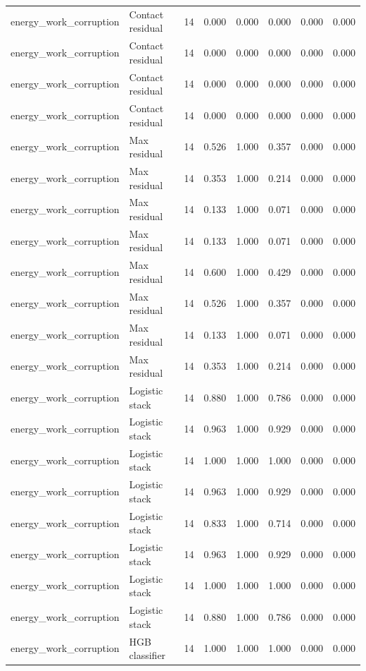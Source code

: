 {\begin{longtable}{llrrrrrr}
energy\_work\_corruption & Contact residual & 14 & 0.000 & 0.000 & 0.000 & 0.000 & 0.000 \\
energy\_work\_corruption & Contact residual & 14 & 0.000 & 0.000 & 0.000 & 0.000 & 0.000 \\
energy\_work\_corruption & Contact residual & 14 & 0.000 & 0.000 & 0.000 & 0.000 & 0.000 \\
energy\_work\_corruption & Contact residual & 14 & 0.000 & 0.000 & 0.000 & 0.000 & 0.000 \\
energy\_work\_corruption & Max residual & 14 & 0.526 & 1.000 & 0.357 & 0.000 & 0.000 \\
energy\_work\_corruption & Max residual & 14 & 0.353 & 1.000 & 0.214 & 0.000 & 0.000 \\
energy\_work\_corruption & Max residual & 14 & 0.133 & 1.000 & 0.071 & 0.000 & 0.000 \\
energy\_work\_corruption & Max residual & 14 & 0.133 & 1.000 & 0.071 & 0.000 & 0.000 \\
energy\_work\_corruption & Max residual & 14 & 0.600 & 1.000 & 0.429 & 0.000 & 0.000 \\
energy\_work\_corruption & Max residual & 14 & 0.526 & 1.000 & 0.357 & 0.000 & 0.000 \\
energy\_work\_corruption & Max residual & 14 & 0.133 & 1.000 & 0.071 & 0.000 & 0.000 \\
energy\_work\_corruption & Max residual & 14 & 0.353 & 1.000 & 0.214 & 0.000 & 0.000 \\
energy\_work\_corruption & Logistic stack & 14 & 0.880 & 1.000 & 0.786 & 0.000 & 0.000 \\
energy\_work\_corruption & Logistic stack & 14 & 0.963 & 1.000 & 0.929 & 0.000 & 0.000 \\
energy\_work\_corruption & Logistic stack & 14 & 1.000 & 1.000 & 1.000 & 0.000 & 0.000 \\
energy\_work\_corruption & Logistic stack & 14 & 0.963 & 1.000 & 0.929 & 0.000 & 0.000 \\
energy\_work\_corruption & Logistic stack & 14 & 0.833 & 1.000 & 0.714 & 0.000 & 0.000 \\
energy\_work\_corruption & Logistic stack & 14 & 0.963 & 1.000 & 0.929 & 0.000 & 0.000 \\
energy\_work\_corruption & Logistic stack & 14 & 1.000 & 1.000 & 1.000 & 0.000 & 0.000 \\
energy\_work\_corruption & Logistic stack & 14 & 0.880 & 1.000 & 0.786 & 0.000 & 0.000 \\
energy\_work\_corruption & HGB classifier & 14 & 1.000 & 1.000 & 1.000 & 0.000 & 0.000 \\

\end{longtable}}
